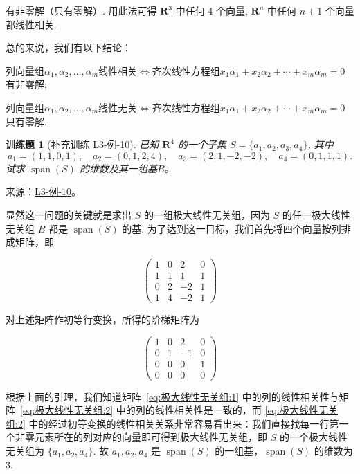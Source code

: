 \documentclass[12pt,fontset=fandol]{ctexart}
\newtheorem{exercise}{训练题}[section]
\begin{document}
\begin{solve}
              有非零解（只有零解）. 用此法可得 $\mathbf{R}^3$ 中任何 4 个向量, $\mathbf{R}^n$ 中任何 $n + 1$ 个向量都线性相关.

              总的来说，我们有以下结论：

              列向量组$\alpha_1,\alpha_2,\ldots,\alpha_m$线性相关$\iff$齐次线性方程组$x_1\alpha_1+x_2\alpha_2+\cdots+x_m\alpha_m=0$有非零解;

              列向量组$\alpha_1,\alpha_2,\ldots,\alpha_m$线性无关$\iff$齐次线性方程组$x_1\alpha_1+x_2\alpha_2+\cdots+x_m\alpha_m=0$只有零解.
\end{solve}

\begin{exercise}[补充训练 L3-例-10]\label{prob:L3-例-10}
已知 $\mathbf{R}^4$ 的一个子集 $S = \{a_1, a_2, a_3, a_4\}$, 其中
    \[
        a_1 = (1,1,0,1), \quad a_2 = (0,1,2,4), \quad
        a_3 = (2,1,-2,-2), \quad a_4 = (0,1,1,1).
    \]
    试求 $\operatorname{span}(S)$ 的维数及其一组基$B$。
\end{exercise}
\noindent 来源：\href{https://github.com/yhwu-is/Linear-Algebra-Left-Undone/blob/new/%E8%AE%B2%E4%B9%89/%E4%B8%93%E9%A2%98/3%20%E6%9C%89%E9%99%90%E7%BB%B4%E7%BA%BF%E6%80%A7%E7%A9%BA%E9%97%B4.tex}{L3-例-10}。
\begin{solve}
显然这一问题的关键就是求出 $S$ 的一组极大线性无关组，因为 $S$ 的任一极大线性无关组 $B$ 都是 $\operatorname{span}(S)$ 的基. 为了达到这一目标，我们首先将四个向量按列排成矩阵，即

    \begin{equation} \label{eq:极大线性无关组:1}
        \begin{pmatrix}
            1 & 0 & 2  & 0 \\
            1 & 1 & 1  & 1 \\
            0 & 2 & -2 & 1 \\
            1 & 4 & -2 & 1
        \end{pmatrix}
    \end{equation}

    对上述矩阵作初等行变换，所得的阶梯矩阵为

    \begin{equation} \label{eq:极大线性无关组:2}
        \begin{pmatrix}
            1 & 0 & 2  & 0 \\
            0 & 1 & -1 & 0 \\
            0 & 0 & 0  & 1 \\
            0 & 0 & 0  & 0
        \end{pmatrix}
    \end{equation}

    根据上面的引理，我们知道矩阵~\eqref{eq:极大线性无关组:1} 中的列的线性相关性与矩阵~\eqref{eq:极大线性无关组:2} 中的列的线性相关性是一致的，而 \eqref{eq:极大线性无关组:2} 中的经过初等变换的线性相关关系非常容易看出来：我们直接找每一行第一个非零元素所在的列对应的向量即可得到极大线性无关组，即 $S$ 的一个极大线性无关组为 $\{a_1, a_2, a_4\}$. 故 $a_1, a_2, a_4$ 是 $\operatorname{span}(S)$ 的一组基，$\operatorname{span}(S)$ 的维数为 3.
\end{solve}
\end{document}
